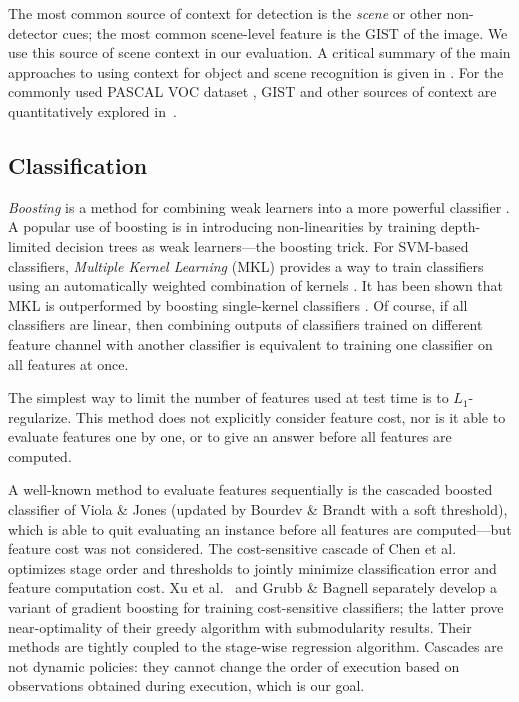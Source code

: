 The most common source of context for detection is the \emph{scene} or other non-detector cues; the most common scene-level feature is the GIST \cite{Oliva-IJCV-2001} of the image.
We use this source of scene context in our evaluation.
A critical summary of the main approaches to using context for object and scene recognition is given in \cite{Galleguillos2010}.
For the commonly used PASCAL VOC dataset \cite{pascal-voc-2010}, GIST and other sources of context are quantitatively explored in~\cite{Divvala2009}.


\subsection{Classification}

\emph{Boosting} is a method for combining weak learners into a more powerful classifier \parencite{Hastie2009}.
A popular use of boosting is in introducing non-linearities by training depth-limited decision trees as weak learners---the boosting trick.
For SVM-based classifiers, \emph{Multiple Kernel Learning} (MKL) provides a way to train classifiers using an automatically weighted combination of kernels \parencite{Lanckriet2004}.
It has been shown that MKL is outperformed by boosting single-kernel classifiers \parencite{Gehler2009}.
Of course, if all classifiers are linear, then combining outputs of classifiers trained on different feature channel with another classifier is equivalent to training one classifier on all features at once.

The simplest way to limit the number of features used at test time is to $L_1$-regularize.
This method does not explicitly consider feature cost, nor is it able to evaluate features one by one, or to give an answer before all features are computed.

A well-known method to evaluate features sequentially is the cascaded boosted classifier of Viola \& Jones \parencite{Viola2004} (updated by Bourdev \& Brandt \parencite{Bourdev-CVPR-2005} with a soft threshold), which is able to quit evaluating an instance before all features are computed---but feature cost was not considered.
The cost-sensitive cascade of Chen et al.\ \parencite{Chen-AISTATS-2012} optimizes stage order and thresholds to jointly minimize classification error and feature computation cost.
Xu et al.\ \parencite{Xu-ICML-2012} and Grubb \& Bagnell \parencite{Grubb-AISTATS-2012} separately develop a variant of gradient boosting for training cost-sensitive classifiers; the latter prove near-optimality of their greedy algorithm with submodularity results.
Their methods are tightly coupled to the stage-wise regression algorithm.
Cascades are not dynamic policies: they cannot change the order of execution based on observations obtained during execution, which is our goal.

